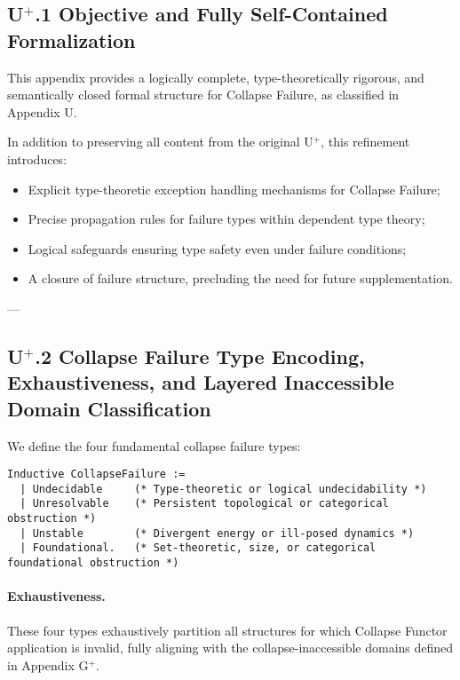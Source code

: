 \documentclass[11pt]{article}
\begin{document}
\subsection*{U$^{+}$.1 Objective and Fully Self-Contained Formalization}

This appendix provides a logically complete, type-theoretically rigorous, and semantically closed formal structure for Collapse Failure, as classified in Appendix U.

In addition to preserving all content from the original U$^{+}$, this refinement introduces:

\begin{itemize}
    \item Explicit type-theoretic exception handling mechanisms for Collapse Failure;
    \item Precise propagation rules for failure types within dependent type theory;
    \item Logical safeguards ensuring type safety even under failure conditions;
    \item A closure of failure structure, precluding the need for future supplementation.
\end{itemize}

---

\subsection*{U$^{+}$.2 Collapse Failure Type Encoding, Exhaustiveness, and Layered Inaccessible Domain Classification}

We define the four fundamental collapse failure types:

\begin{lstlisting}[language=Coq]
Inductive CollapseFailure :=
  | Undecidable     (* Type-theoretic or logical undecidability *)
  | Unresolvable    (* Persistent topological or categorical obstruction *)
  | Unstable        (* Divergent energy or ill-posed dynamics *)
  | Foundational.   (* Set-theoretic, size, or categorical foundational obstruction *)
\end{lstlisting}

\paragraph{Exhaustiveness.} These four types exhaustively partition all structures for which Collapse Functor application is invalid, fully aligning with the collapse-inaccessible domains defined in Appendix G$^{+}$.
\end{document}
